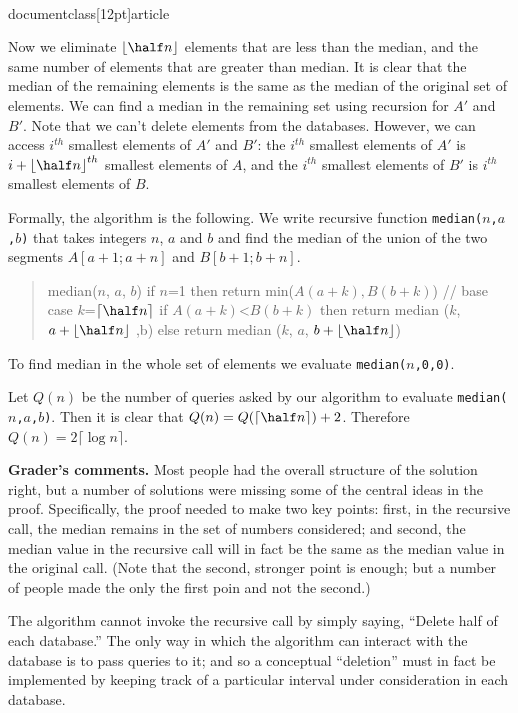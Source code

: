 \\documentclass[12pt]{article}
\newcommand{\cel}[1]{
{\lceil {#1} \rceil}
}
\newcommand{\flr}[1]{
{\lfloor {#1} \rfloor}
}
\begin{document}
\begin{enumerate}
{Now we eliminate $\flr{\half n}$ elements that are less than the median,
and the same number of elements that are greater than median.
It is clear that the
median of the remaining elements is the same as 
the median of the original set of   
elements.
We can find a median in the remaining set 
using recursion for $A'$ and $B'$.    
Note that we can't delete elements from the databases.
However, we can access $i^{th}$ smallest elements of $A'$ and $B'$:
the $i^{th}$ smallest elements of $A'$ is $i+\flr{\half n }^{th}$ smallest 
elements of $A$, and
the $i^{th}$ smallest elements of $B'$ is $i^{th}$ smallest
elements of $B$.

Formally, the algorithm is the following.
We write recursive function {\tt median($n$,$a$,$b$)}
that takes integers $n$, $a$ and $b$  and
find the median of the union of the two segments $A[a+1; a+n]$ and
$B[b+1; b+n]$.

\begin{quote}
\begin{code}
median($n$, $a$, $b$)
   if $n$=1 then return min($A(a+k),B(b+k)$) // base case
   $k$=$\cel{\half n }$
   if $A(a+k)$<$B(b+k)$
     then return median ($k$, $a+\flr{\half n }$ ,b)
     else return median ($k$, $a$, $b+\flr{\half n }$)
\end{code}
\end{quote}

To find median in the whole set of elements we evaluate
{\tt median($n$,0,0)}.

Let $Q(n)$ be the number of queries asked by our algorithm to evaluate
{\tt median($n$,$a$,$b$)}.
Then it is clear that $Q(n)=Q(\cel{\half n })+2$.
Therefore $Q(n)=2\cel{\log n}$.

\bigskip

\noindent
{\bf Grader's comments.} 
Most people had the overall structure of the solution right,
but a number of solutions were missing some of the central
ideas in the proof.  Specifically, the proof needed to 
make two key points: first, in the recursive call, the
median remains in the set of numbers considered;
and second, the median value in the recursive call
will in fact be the same as the median value in
the original call.  (Note that the second, stronger point is
enough; but a number of people made the only the first 
poin and not the second.)

The algorithm cannot invoke the recursive call by
simply saying, ``Delete half of each database.''  The only way
in which the algorithm can interact with the database is
to pass queries to it; and so a conceptual ``deletion''
must in fact be implemented by keeping track of a particular
interval under consideration in each database.

}
\end{enumerate}
\end{document}
